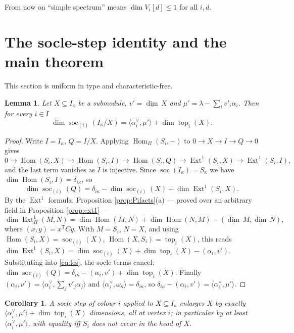 \documentclass[reqno]{amsart}
\theoremstyle{plain}
\newtheorem{lemma}[theorem]{Lemma}
\newtheorem{corollary}[theorem]{Corollary}
\theoremstyle{definition}
\DeclareMathOperator{\soc}{soc}
\DeclareMathOperator{\topp}{top}
\DeclareMathOperator{\Hom}{Hom}
\DeclareMathOperator{\Ext}{Ext}
\newcommand{\dimv}{\underline{\dim}\,}
\newcommand{\la}{\lambda}
\newcommand{\al}{\alpha}
\newcommand{\om}{\omega}
\newcommand{\ka}{\kappa}
\newcommand{\Pia}{\Pi}
\begin{document}
From now on ``simple spectrum'' means $\dim V_i[d]\le1$ for all $i,d$.

\section{The socle-step identity and the main theorem}\label{sec:main}

This section is uniform in type and characteristic-free.

\begin{lemma}\label{lem:cb}
Let $X\subseteq I_\ka$ be a submodule, $v'=\dimv X$ and
$\mu'=\la-\sum_iv'_i\al_i$.  Then for every $i\in I$
\[
   \dim\soc_{(i)}(I_\ka/X)=\langle\al_i^\vee,\mu'\rangle+\dim\topp_i(X).
\]
\end{lemma}

\begin{proof}
Write $I=I_\ka$, $Q=I/X$.  Applying $\Hom_\Pia(S_i,-)$ to
$0\to X\to I\to Q\to 0$ gives
\[
0\to\Hom(S_i,X)\to\Hom(S_i,I)\to\Hom(S_i,Q)\to\Ext^1(S_i,X)\to\Ext^1(S_i,I),
\]
and the last term vanishes as $I$ is injective.  Since $\soc(I_\ka)=S_\ka$ we
have $\dim\Hom(S_i,I)=\delta_{i\ka}$, so
\begin{equation}\label{eq:les}
  \dim\soc_{(i)}(Q)=\delta_{i\ka}-\dim\soc_{(i)}(X)+\dim\Ext^1(S_i,X).
\end{equation}
By the $\Ext^1$ formula, Proposition \ref{prop:Pifacts}(a) --- proved over an
arbitrary field in Proposition \ref{prop:ext1} ---
\[
  \dim\Ext^1_\Pia(M,N)=\dim\Hom(M,N)+\dim\Hom(N,M)-(\dimv M,\dimv N),
\]
where $(x,y)=x^{\mathsf T}Cy$.  With $M=S_i$, $N=X$, and using
$\Hom(S_i,X)=\soc_{(i)}(X)$, $\Hom(X,S_i)=\topp_i(X)$, this reads
$\dim\Ext^1(S_i,X)=\dim\soc_{(i)}(X)+\dim\topp_i(X)-(\al_i,v')$.  Substituting
into \eqref{eq:les}, the socle terms cancel:
$\dim\soc_{(i)}(Q)=\delta_{i\ka}-(\al_i,v')+\dim\topp_i(X)$.  Finally
$(\al_i,v')=\langle\al_i^\vee,\sum_jv'_j\al_j\rangle$ and
$\langle\al_i^\vee,\om_\ka\rangle=\delta_{i\ka}$, so
$\delta_{i\ka}-(\al_i,v')=\langle\al_i^\vee,\mu'\rangle$.
\end{proof}

\begin{corollary}\label{cor:mono}
A socle step of colour $i$ applied to $X\subseteq I_\ka$ enlarges $X$ by
exactly $\langle\al_i^\vee,\mu'\rangle+\dim\topp_i(X)$ dimensions, all at
vertex $i$; in particular by at least $\langle\al_i^\vee,\mu'\rangle$, with
equality iff $S_i$ does not occur in the head of $X$.
\end{corollary}
\end{document}
